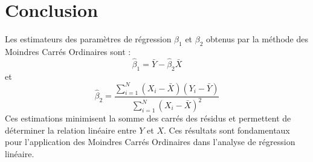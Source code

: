 \documentclass[14pt]{extarticle} %
\begin{document}
\section{Conclusion}
Les estimateurs des paramètres de régression \(\beta_1\) et \(\beta_2\) obtenus par la méthode des Moindres Carrés Ordinaires sont :
\[
\hat{\beta}_1 = \bar{Y} - \hat{\beta}_2 \bar{X}
\]
et
\[
\hat{\beta}_2 = \frac{\sum_{i=1}^N (X_i - \bar{X})(Y_i - \bar{Y})}{\sum_{i=1}^N (X_i - \bar{X})^2}
\]
Ces estimations minimisent la somme des carrés des résidus et permettent de déterminer la relation linéaire entre \(Y\) et \(X\). Ces résultats sont fondamentaux pour l'application des Moindres Carrés Ordinaires dans l'analyse de régression linéaire.
\end{document}
